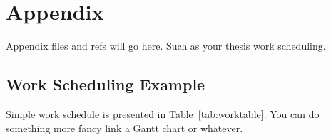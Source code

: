 
\section{Appendix} %
\label{sec:attachments}

Appendix files and refs will go here.
Such as your thesis work scheduling. 

\subsection{Work Scheduling Example} %
\label{sub:work_scheduling}
Simple work schedule is presented in Table~\ref{tab:worktable}. You can do something more fancy link a Gantt chart or whatever.
